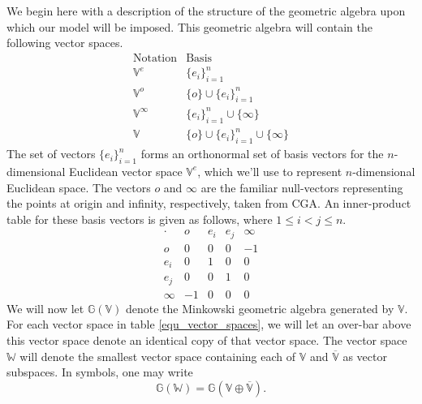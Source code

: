 \documentclass{birkjour}
\theoremstyle{definition}
\theoremstyle{remark}
\numberwithin{equation}{section}
\newcommand{\G}{\mathbb{G}}
\newcommand{\V}{\mathbb{V}}
\newcommand{\Vb}{\mathbb{\overline{V}}}
\newcommand{\W}{\mathbb{W}}
\newcommand{\nvao}{o}
\newcommand{\nvai}{\infty}
\begin{document}
We begin here with a description of the structure of the geometric algebra upon
which our model will be imposed.  This
geometric algebra will contain the following vector spaces.
\begin{equation}\label{equ_vector_spaces}
\begin{array}{ll}
\mbox{Notation} & \mbox{Basis} \\
\hline
\V^e & \{e_i\}_{i=1}^n \\
\V^{\nvao} & \{\nvao\}\cup\{e_i\}_{i=1}^n \\
\V^{\nvai} & \{e_i\}_{i=1}^n\cup\{\nvai\} \\
\V & \{\nvao\}\cup\{e_i\}_{i=1}^n\cup\{\nvai\}
\end{array}
\end{equation}
The set of vectors $\{e_i\}_{i=1}^n$ forms an orthonormal set of basis
vectors for the $n$-dimensional Euclidean vector space $\V^e$, which we'll
use to represent $n$-dimensional Euclidean space.
The vectors $\nvao$ and $\nvai$ are the familiar null-vectors representing the
points at origin and infinity, respectively, taken from CGA.
An inner-product table for these basis vectors is given as follows, where
$1\leq i<j\leq n$.
\begin{equation}
\begin{array}{c|cccc}
\cdot & \nvao & e_i & e_j & \nvai \\
\hline
\nvao & 0 & 0 & 0 & -1 \\
e_i & 0 & 1 & 0 & 0 \\
e_j & 0 & 0 & 1 & 0 \\
\nvai & -1 & 0 & 0 & 0
\end{array}
\end{equation}
We will now let $\G(\V)$ denote the Minkowski geometric algebra generated by $\V$.
For each vector space in table \eqref{equ_vector_spaces}, we will let an over-bar
above this vector space denote an identical copy of that vector space.  The vector
space $\W$ will denote the smallest vector space containing each of $\V$ and $\Vb$
as vector subspaces.  In symbols, one may write
\begin{equation}
\G(\W) = \G(\V\oplus\Vb).
\end{equation}
\end{document}

